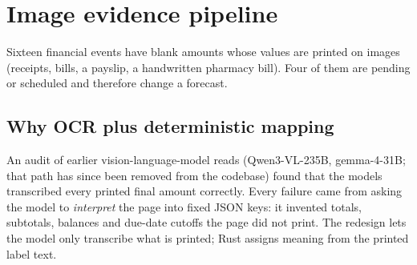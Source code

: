 \documentclass[11pt,a4paper]{article}
\begin{document}
\section{Image evidence pipeline}

Sixteen financial events have blank amounts whose values are printed on images (receipts, bills, a payslip, a
handwritten pharmacy bill). Four of them are pending or scheduled and therefore change a forecast.

\subsection{Why OCR plus deterministic mapping}
An audit of earlier vision-language-model reads (Qwen3-VL-235B, gemma-4-31B; that path has since been removed from the codebase) found that the models transcribed every
printed final amount correctly. Every failure came from asking the model to \emph{interpret} the page into fixed JSON keys:
it invented totals, subtotals, balances and due-date cutoffs the page did not print. The redesign lets the model only
transcribe what is printed; Rust assigns meaning from the printed label text.
\end{document}
